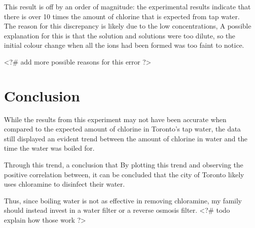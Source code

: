 \documentclass[11pt]{article}
\begin{document}
This result is off by an order of magnitude: the experimental results indicate that there is over 10 times the amount of chlorine that is expected from tap water. The reason for this discrepancy is likely due to the low concentrations, A possible explanation for this is that the  solution and  solutions were too dilute, so the initial colour change when all the  ions had been formed was too faint to notice.

<?# add more possible reasons for this error ?>

\section{Conclusion}

While the results from this experiment may not have been accurate when compared to the expected amount of chlorine in Toronto's tap water, the data still displayed an evident trend between the amount of chlorine in water and the time the water was boiled for.


Through this trend, a conclusion that By plotting this trend and observing the positive correlation between, it can be concluded that the city of Toronto likely uses chloramine to disinfect their water.

Thus, since boiling water is not as effective in removing chloramine, my family should instead invest in a water filter or a reverse osmosis filter. <?# todo explain how those work ?>
\end{document}
